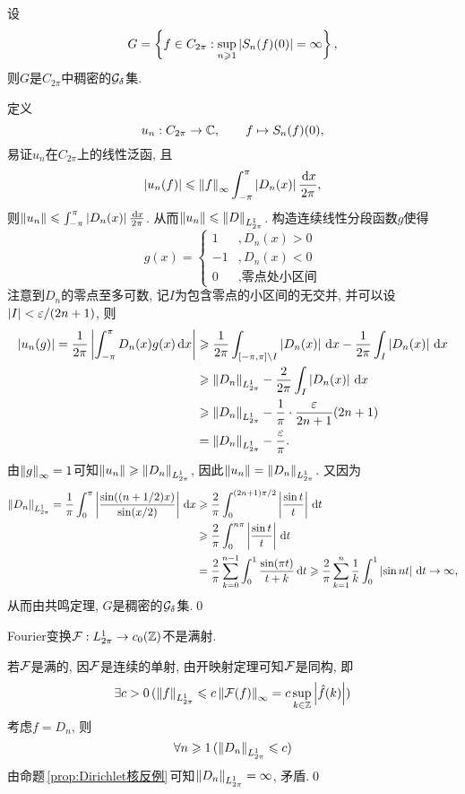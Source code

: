 	\begin{Proposition}\label{prop:Dirichlet核反例}
	设
	\[
	G=\left\{ f\in C_{2\pi} : \sup_{n\geqslant 1}\left| S_n(f)(0) \right| =\infty \right\},
	\]
	则$ G $是$ C_{2\pi} $中稠密的$ \mathcal{G}_{\delta} $集.
	\end{Proposition}
	\begin{Proof}
	定义
	\[
	u_n : C_{2\pi}\to\mathbb{C},\qquad f\mapsto S_n(f)(0),
	\]
	易证$ u_n $在$ C_{2\pi} $上的线性泛函, 且
	\[
	\left| u_n(f) \right| \leqslant\left\| f \right\|_\infty\int_{-\pi}^\pi \left| D_n(x) \right| \frac{\,\mathrm{d} x}{2\pi},
	\]
	则$ \left\| u_n \right\|\leqslant\int_{-\pi}^\pi\left| D_n(x) \right| \frac{\,\mathrm{d} x}{2\pi} $. 从而$ \left\| u_n \right\|\leqslant\left\| D \right\|_{L_{2\pi}^1} $. 构造连续线性分段函数$ g $使得
	\[
	g(x)=\begin{cases}
	1 & ,D_n(x)>0\\-1 & ,D_n(x)<0\\0 & ,\text{零点处小区间}
	\end{cases}
	\]
	注意到$ D_n $的零点至多可数, 记$ I $为包含零点的小区间的无交并, 并可以设$ \left| I \right| <\varepsilon/(2n+1) $, 则
	\[
	\begin{aligned}
	\left| u_n(g) \right| =\frac{1}{2\pi}\left| \int_{-\pi}^\pi D_n(x)g(x)\,\mathrm{d} x \right| &\geqslant\frac{1}{2\pi}\int_{[-\pi,\pi]\setminus I}\left| D_n(x) \right| \,\mathrm{d} x-\frac{1}{2\pi}\int_I\left| D_n(x) \right| \,\mathrm{d} x\\
	&\geqslant\left\| D_n \right\|_{L_{2\pi}^1}-\frac{2}{2\pi}\int_I\left| D_n(x) \right| \,\mathrm{d} x\\
	&\geqslant\left\| D_n \right\|_{L_{2\pi}^1}-\frac{1}{\pi}\cdot\frac{\varepsilon}{2n+1}(2n+1)\\
	&=\left\| D_n \right\|_{L_{2\pi}^1}-\frac{\varepsilon}{\pi}.
	\end{aligned}
	\]
	由$ \left\| g \right\|_\infty=1 $可知$ \left\| u_n \right\|\geqslant \left\| D_n \right\|_{L_{2\pi}^1} $, 因此$ \left\| u_n \right\|=\left\| D_n \right\|_{L_{2\pi}^1} $. 又因为
	\[
	\begin{aligned}
	\left\| D_n \right\|_{L_{2\pi}^1}=\frac{1}{\pi}\int_0^\pi\left| \frac{\sin((n+1/2)x)}{\sin(x/2)} \right| \,\mathrm{d} x&\geqslant\frac{2}{\pi}\int_0^{(2n+1)\pi/2}\left| \frac{\sin t}{t} \right| \,\mathrm{d} t\\
	&\geqslant\frac{2}{\pi}\int_0^{n\pi}\left| \frac{\sin t}{t} \right| \,\mathrm{d} t\\
	&=\frac{2}{\pi}\sum_{k=0}^{n-1}\int_0^1\frac{\sin(\pi t)}{t+k}\,\mathrm{d} t\geqslant\frac{2}{\pi}\sum_{k=1}^n\frac{1}{k}\int_0^1\left| \sin nt \right| \,\mathrm{d} t\to \infty,
	\end{aligned}
	\]
	从而由共鸣定理, $ G $是稠密的$ \mathcal{G}_{\delta} $集.\qed
	\end{Proof}
	
	\begin{Proposition}
	Fourier变换$ \mathcal{F} : L_{2\pi}^1\to c_0(\mathbb{Z}) $不是满射.
	\end{Proposition}
	\begin{Proof}
	若$ \mathcal{F} $是满的, 因$ \mathcal{F} $是连续的单射, 由开映射定理可知$ \mathcal{F} $是同构, 即
	\[
	\exists c>0\,(\left\| f \right\|_{L_{2\pi}^1}\leqslant c\left\| \mathcal{F}(f) \right\|_\infty=c\sup_{k\in\mathbb{Z}}\left| \hat{f}(k) \right| )
	\]
	考虑$ f=D_n $, 则
	\[
	\forall n\geqslant 1\,(\left\| D_n \right\|_{L_{2\pi}^1}\leqslant c)
	\]
	由命题\,\ref{prop:Dirichlet核反例}\,可知$ \left\| D_n \right\|_{L_{2\pi}^1}=\infty $, 矛盾.\qed
	\end{Proof}
	
